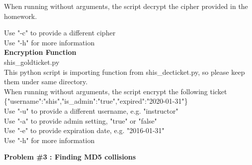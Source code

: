 \documentclass[12pt]{article}  %
\begin{document}
\medskip
When running without arguments, the script decrypt the cipher provided in the
homework.

Use "-c" to provide a different cipher\\
Use "-h" for more information\\
\bigskip
{\bf Encryption Function}\\
\medskip
shis\_goldticket.py\\
\medskip
This python script is importing function from shis\_decticket.py,
so please keep them under same directory.\\
\medskip
When running without arguments, the script encrypt the following ticket
\{"username":"shis","is\_admin":"true","expired":"2020-01-31"\}\\
\medskip
Use "-u" to provide a different username, e.g. "instructor"\\
Use "-a" to provide admin setting, "true" or "false"\\
Use "-e" to provide expiration date, e.g. "2016-01-31"\\
Use "-h" for more information\\

%
%
\newpage
\begin{center}
\textbf{Problem \#3 : Finding MD5 collisions}
\end{center}
\end{document}
